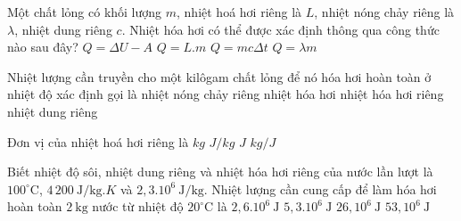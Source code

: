 \begin{ex}
	{\color{red}\footnotesize\ttfamily [L12C1B1-TN-24]}\par %
	Một chất lỏng có khối lượng $m$, nhiệt hoá hơi riêng là $L$, nhiệt nóng chảy riêng là $\lambda$, nhiệt dung riêng $c$. Nhiệt hóa hơi có thể được xác định thông qua công thức nào sau đây?
	\choice
	{$Q = \Delta U - A$}
	{\True $Q=L.m$}
	{$Q=mc\Delta t$}
	{$Q=\lambda m$}
\end{ex}

\begin{ex}
	{\color{red}\footnotesize\ttfamily [L12C1B1-TN-28]}\par %
	Nhiệt lượng cần truyền cho một kilôgam chất lỏng để nó hóa hơi hoàn toàn ở nhiệt độ xác định gọi là 
	\choice
	{nhiệt nóng chảy riêng}
	{nhiệt hóa hơi}
	{\True nhiệt hóa hơi riêng}
	{nhiệt dung riêng} 
\end{ex}

\begin{ex}
	{\color{red}\footnotesize\ttfamily [L12C1B1-TN-30]}\par %
	Đơn vị của nhiệt hoá hơi riêng là
	\choice
	{$kg$}
	{\True $J/kg$}
	{$J$}
	{$kg/J$}
\end{ex}

\begin{ex}
	{\color{red}\footnotesize\ttfamily [L12C1B1-TN-31]}\par %
	Biết nhiệt độ sôi, nhiệt dung riêng và nhiệt hóa hơi riêng của nước lần lượt là $100^\circ \mathrm{C}$, $4\,200\ \mathrm{J/kg}.K$ và $2{,}3.10^6\ \mathrm{J/kg}$. Nhiệt lượng cần cung cấp để làm hóa hơi hoàn toàn $2\ \mathrm{kg}$ nước từ nhiệt độ $20^\circ \mathrm{C}$ là
	\choice
	{$2{,}6.10^6\ \mathrm{J}$}
	{\True $5{,}3.10^6\ \mathrm{J}$}
	{$26{,}10^6\ \mathrm{J}$}
	{ $53{,}10^6\ \mathrm{J}$}
\end{ex}


